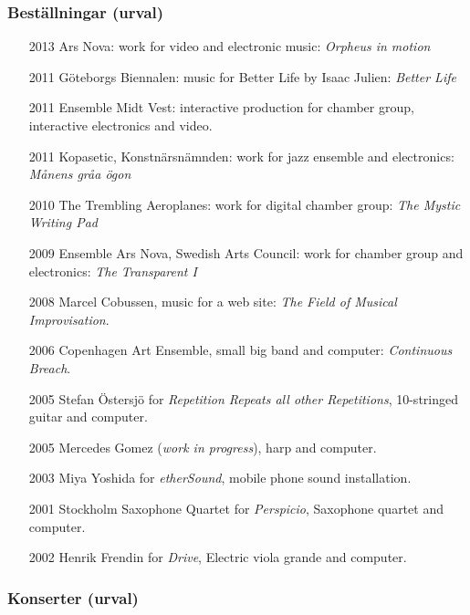 \subsubsection*{\textsf{Beställningar (urval)}}
\begin{enumerate}
\item [2013] Ars Nova: work for video and electronic music: \emph{Orpheus in motion}
\item [2011] G\"{o}teborgs Biennalen: music for Better Life by Isaac Julien: \emph{Better Life}
\item [2011] Ensemble Midt Vest: interactive production for chamber group, interactive electronics and video.
\item[2011] Kopasetic, Konstn\"arsn\"amnden: work for jazz ensemble and electronics: \emph{M\r{a}nens gr\r{a}a \"{o}gon}
\item [2010] The Trembling Aeroplanes: work for digital chamber group: \emph{The Mystic Writing Pad}
\item [2009] Ensemble Ars Nova, Swedish Arts Council: work for chamber group and electronics: \emph{The Transparent I}
\item[2008] Marcel Cobussen, music for a web site: \emph{The Field of Musical Improvisation}.
 \item[2006] Copenhagen Art Ensemble, small big band and computer: \emph{Continuous Breach}.
 \item[2005] Stefan \"Ostersj\"o for \emph{Repetition Repeats all other
 Repetitions}, 10-stringed guitar and computer.
 \item[2005] Mercedes Gomez (\emph{work in progress}), harp and
 computer.
 \item[2003] Miya Yoshida for \emph{etherSound}, mobile phone sound
 installation.
 \item[2001] Stockholm Saxophone Quartet for \emph{Perspicio}, Saxophone
 quartet and computer.
 \item[2002] Henrik Frendin for \emph{Drive}, Electric viola grande and
 computer. 
\end{enumerate}

\subsubsection*{\textsf{Konserter (urval)}}

